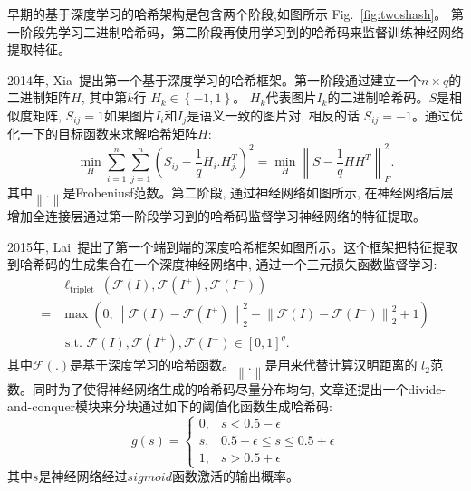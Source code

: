 早期的基于深度学习的哈希架构是包含两个阶段,如图所示 Fig.~\ref{fig:twoshash}。 第一阶段先学习二进制哈希码，第二阶段再使用学习到的哈希码来监督训练神经网络提取特征。\par
2014年, Xia~\cite{xia2014supervised}提出第一个基于深度学习的哈希框架。第一阶段通过建立一个$n \times q$的二进制矩阵$H$, 其中第$k$行 $H_k \in \left \{ -1, 1 \right \}$。 $H_k$代表图片$I_k$的二进制哈希码。$S$是相似度矩阵, $S_{ij} = 1$如果图片$I_i$和$I_j$是语义一致的图片对, 相反的话 $S_{ij} = -1$。通过优化一下的目标函数来求解哈希矩阵$H$:
\begin{equation}
    \min _H \sum_{i=1}^n \sum_{j=1}^n\left(S_{i j}-\frac{1}{q} H_i . H_{j .}^T\right)^2=\min _H\left\|S-\frac{1}{q} H H^T\right\|_F^2.
\end{equation}
其中$\left\| . \right\|$是Frobeniusf范数。第二阶段, 通过神经网络如图所示, 在神经网络后层增加全连接层通过第一阶段学习到的哈希码监督学习神经网络的特征提取。 \par

2015年, Lai~\cite{lai2015simultaneous}提出了第一个端到端的深度哈希框架如图所示。这个框架把特征提取到哈希码的生成集合在一个深度神经网络中, 通过一个三元损失函数监督学习:
\begin{equation}
    \begin{aligned}
        & \ell_{\text {triplet }}\left(\mathcal{F}(I), \mathcal{F}\left(I^{+}\right), \mathcal{F}\left(I^{-}\right)\right) \\
        = & \max \left(0,\left\|\mathcal{F}(I)-\mathcal{F}\left(I^{+}\right)\right\|_2^2-\left\|\mathcal{F}(I)-\mathcal{F}\left(I^{-}\right)\right\|_2^2+1\right) \\
        & \text { s.t. } \mathcal{F}(I), \mathcal{F}\left(I^{+}\right), \mathcal{F}\left(I^{-}\right) \in[0,1]^q.
        \end{aligned}
\end{equation}
其中$\mathcal{F}(.)$是基于深度学习的哈希函数。$\left \| . \right \|$是用来代替计算汉明距离的 $l_2$范数。同时为了使得神经网络生成的哈希码尽量分布均匀, 文章还提出一个divide-and-conquer模块来分块通过如下的阈值化函数生成哈希码:
\begin{equation}
    g(s)=\left\{\begin{array}{rr}
        0, & s<0.5-\epsilon \\
        s, & 0.5-\epsilon \leq s \leq 0.5+\epsilon \\
        1, & s>0.5+\epsilon
        \end{array}\right.
\end{equation} 
其中$s$是神经网络经过$sigmoid$函数激活的输出概率。

